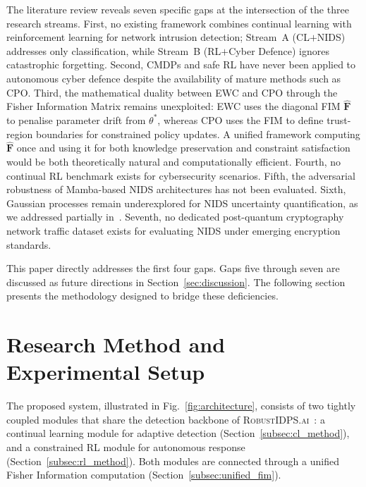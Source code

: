 \documentclass[journal]{IEEEtran}
\theoremstyle{definition}
\theoremstyle{remark}
\newcommand{\RobustIDPS}{\textsc{RobustIDPS.ai}}
\newcommand{\FIM}{\mathbf{F}}
\begin{document}
The literature review reveals seven specific gaps at the intersection of the three research streams. First, no existing framework combines continual learning with reinforcement learning for network intrusion detection; Stream~A (CL$+$NIDS) addresses only classification, while Stream~B (RL$+$Cyber Defence) ignores catastrophic forgetting. Second, CMDPs and safe RL have never been applied to autonomous cyber defence despite the availability of mature methods such as CPO. Third, the mathematical duality between EWC and CPO through the Fisher Information Matrix remains unexploited: EWC uses the diagonal FIM $\hat{\FIM}$ to penalise parameter drift from $\theta^*$, whereas CPO uses the FIM to define trust-region boundaries for constrained policy updates. A unified framework computing $\hat{\FIM}$ once and using it for both knowledge preservation and constraint satisfaction would be both theoretically natural and computationally efficient. Fourth, no continual RL benchmark exists for cybersecurity scenarios. Fifth, the adversarial robustness of Mamba-based NIDS architectures has not been evaluated. Sixth, Gaussian processes remain underexplored for NIDS uncertainty quantification, as we addressed partially in~\cite{anaedevha2026gp}. Seventh, no dedicated post-quantum cryptography network traffic dataset exists for evaluating NIDS under emerging encryption standards.

This paper directly addresses the first four gaps. Gaps five through seven are discussed as future directions in Section~\ref{sec:discussion}. The following section presents the methodology designed to bridge these deficiencies.

\section{Research Method and Experimental Setup}
\label{sec:method}

The proposed system, illustrated in Fig.~\ref{fig:architecture}, consists of two tightly coupled modules that share the detection backbone of \RobustIDPS{}~\cite{anaedevha2026stochastic}: a continual learning module for adaptive detection (Section~\ref{subsec:cl_method}), and a constrained RL module for autonomous response (Section~\ref{subsec:rl_method}). Both modules are connected through a unified Fisher Information computation (Section~\ref{subsec:unified_fim}).
\end{document}
